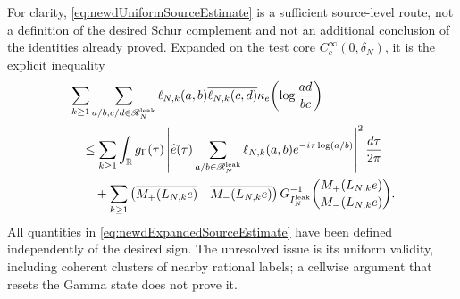 \documentclass[11pt]{amsart}
\theoremstyle{definition}
\theoremstyle{remark}
\newcommand{\R}{\mathbb R}
\begin{document}
For clarity, \eqref{eq:newdUniformSourceEstimate} is a sufficient
source-level route, not a definition of the desired Schur complement and not
an additional conclusion of the identities already proved.  Expanded on the
test core $C_c^\infty(0,\delta_N)$, it is the explicit inequality
\begin{align}
 &\sum_{k\geq1}
 \sum_{a/b,c/d\in\mathscr R_N^{\rm leak}}
 \ell_{N,k}(a,b)\overline{\ell_{N,k}(c,d)}
 \kappa_e\!\left(\log\frac{ad}{bc}\right)
 \notag\\
 &\quad\leq
 \sum_{k\geq1}\int_\R g_\Gamma(\tau)
 \left|\widehat e(\tau)
   \sum_{a/b\in\mathscr R_N^{\rm leak}}
       \ell_{N,k}(a,b)e^{-i\tau\log(a/b)}\right|^2
 \frac{d\tau}{2\pi}
 \notag\\
 &\qquad+
 \sum_{k\geq1}
 \begin{pmatrix}
  \overline{M_+(L_{N,k}e)}&\overline{M_-(L_{N,k}e)}
 \end{pmatrix}
 G_{I_N^{\rm leak}}^{-1}
 \binom{M_+(L_{N,k}e)}{M_-(L_{N,k}e)}.
 \label{eq:newdExpandedSourceEstimate}
\end{align}
All quantities in \eqref{eq:newdExpandedSourceEstimate} have been defined
independently of the desired sign.  The unresolved issue is its uniform
validity, including coherent clusters of nearby rational labels; a cellwise
argument that resets the Gamma state does not prove it.
\end{document}
